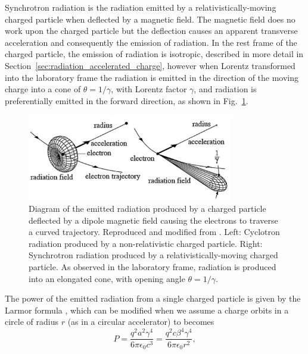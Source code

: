 \documentclass[../main.tex]{subfiles}
\begin{document}
Synchrotron radiation is the radiation emitted by a relativistically-moving charged particle when deflected by a magnetic field. The magnetic field does no work upon the charged particle but the deflection causes an apparent transverse acceleration and consequently the emission of radiation. In the rest frame of the charged particle, the emission of radiation is isotropic, described in more detail in Section~\ref{sec:radiation_accelerated_charge}, however when Lorentz transformed into the laboratory frame the radiation is emitted in the direction of the moving charge into a cone of $\theta = 1/\gamma$, with Lorentz factor $\gamma$, and radiation is preferentially emitted in the forward direction, as shown in Fig.~\ref{fig:synchrotron_radiation_diagram}. 
\begin{figure}[!h]
\centering
\includegraphics[width=0.8\textwidth]{Figures/Introduction/Synchrotron_Radiation_Diagram.pdf}
\caption{Diagram of the emitted radiation produced by a charged particle deflected by a dipole magnetic field causing the electrons to traverse a curved trajectory. Reproduced and modified from \cite{eberhardt2015synchrotron}. Left: Cyclotron radiation produced by a non-relativistic charged particle. Right: Synchrotron radiation produced by a relativistically-moving charged particle. As observed in the laboratory frame, radiation is produced into an elongated cone, with opening angle $\theta = 1/\gamma$.}
\label{fig:synchrotron_radiation_diagram}
\end{figure}
The power of the emitted radiation from a single charged particle is given by the Larmor formula \cite{larmor1897lxiii}, which can be modified when we assume a charge orbits in a circle of radius $r$ (as in a circular accelerator) to becomes
\begin{equation}
P = \frac{q^{2}a^{2}\gamma^{4}}{6\pi\epsilon_{0}c^{3}} = \frac{q^{2}c\beta^{4}\gamma^{4}}{6\pi\epsilon_{0}r^{2}},
\label{eq:synchrotron_radiation_power}    
\end{equation}
\end{document}
